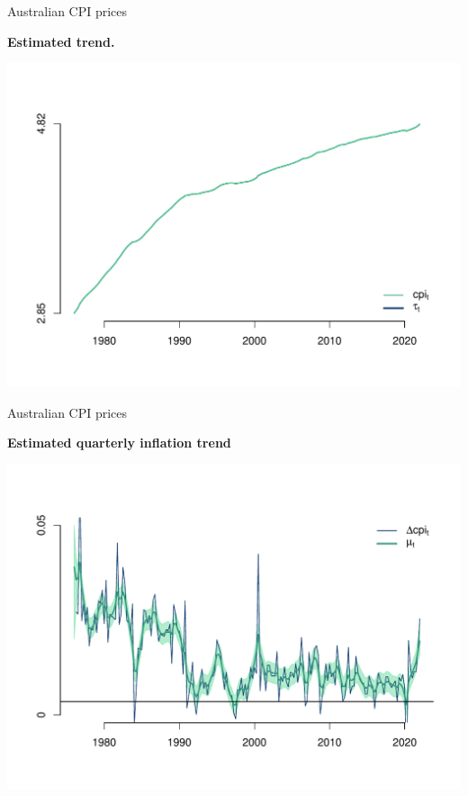 \documentclass[notes,blackandwhite,mathsans,usenames,dvipsnames]{beamer}
\begin{document}
\begin{frame}{Australian CPI prices}

\centering
\smallskip\textbf{Estimated trend.}

\includegraphics[scale=0.65, trim=2cm 0.5cm 2cm 2cm]{results/cpi-uc-tvpdrift-tau.pdf}

\end{frame}




\begin{frame}{Australian CPI prices}

\centering
\smallskip\textbf{Estimated quarterly inflation trend}

\includegraphics[scale=0.65, trim=2cm 0.5cm 2cm 2cm]{results/cpi-uc-tvpdrift-mu.pdf}

\end{frame}
\end{document}
